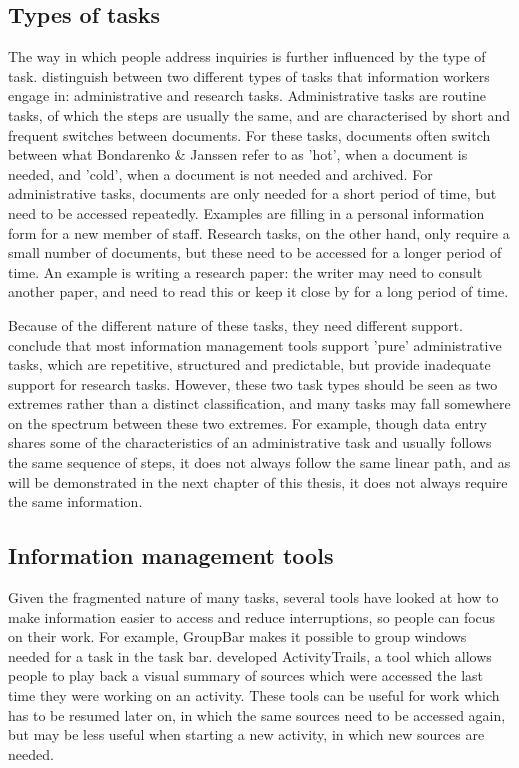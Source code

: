 \subsection{Types of tasks}
The way in which people address inquiries is further influenced by the type of task. \citet{Bondarenko2005} distinguish between two different types of tasks that information workers engage in: administrative and research tasks. Administrative tasks are routine tasks, of which the steps are usually the same, and are characterised by short and frequent switches between documents. For these tasks, documents often switch between what Bondarenko \& Janssen refer to as 'hot', when a document is needed, and 'cold', when a document is not needed and archived. For administrative tasks, documents are only needed for a short period of time, but need to be accessed repeatedly. Examples are filling in a personal information form for a new member of staff. Research tasks, on the other hand, only require a small number of documents, but these need to be accessed for a longer period of time. An example is writing a research paper: the writer may need to consult another paper, and need to read this or keep it close by for a long period of time.

Because of the different nature of these tasks, they need different support. \citet{Bondarenko2005} conclude that most information management tools support 'pure' administrative tasks, which are repetitive, structured and predictable, but provide inadequate support for research tasks. However, these two task types should be seen as two extremes rather than a distinct classification, and many tasks may fall somewhere on the spectrum between these two extremes. For example, though data entry shares some of the characteristics of an administrative task and usually follows the same sequence of steps, it does not always follow the same linear path, and as will be demonstrated in the next chapter of this thesis, it does not always require the same information. 

\subsection{Information management tools}
Given the fragmented nature of many tasks, several tools have looked at how to make information easier to access and reduce interruptions, so people can focus on their work. For example, GroupBar \citep{Smith2003} makes it possible to group windows needed for a task in the task bar. \citet{Cangiano2009} developed ActivityTrails, a tool which allows people to play back a visual summary of sources which were accessed the last time they were working on an activity.  These tools can be useful for work which has to be resumed later on, in which the same sources need to be accessed again, but may be less useful when starting a new activity, in which new sources are needed.

